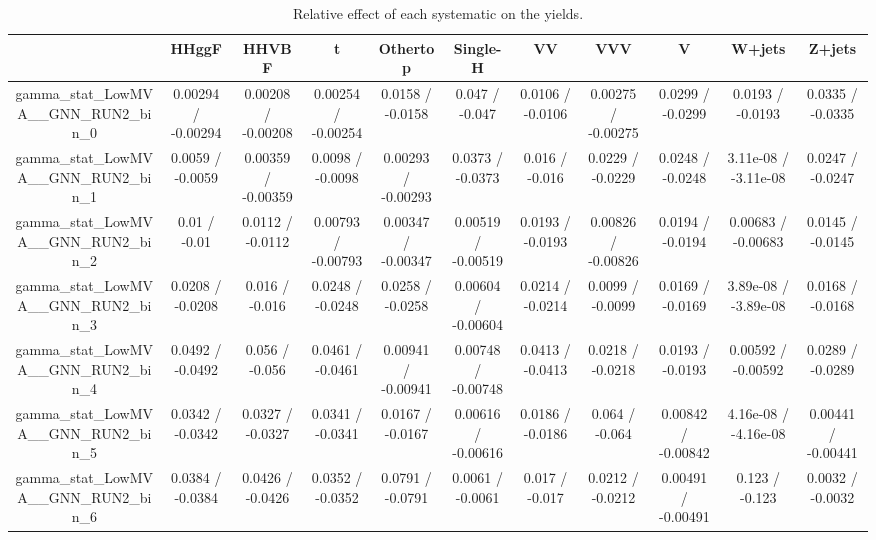 \documentclass[10pt]{article}
\begin{document}
\begin{table}[htbp]
\begin{center}
\begin{tabular}{|c|c|c|c|c|c|c|c|c|c|c|}
\hline 
      & HHggF      & HHVBF      & t      & Othertop      & Single-H      & VV      & VVV      & V      & W+jets      & Z+jets \\ 
\hline 
  gamma_stat_LowMVA__GNN_RUN2_bin_0 & 0.00294 / -0.00294 & 0.00208 / -0.00208 & 0.00254 / -0.00254 & 0.0158 / -0.0158 & 0.047 / -0.047 & 0.0106 / -0.0106 & 0.00275 / -0.00275 & 0.0299 / -0.0299 & 0.0193 / -0.0193 & 0.0335 / -0.0335 \\ 
  gamma_stat_LowMVA__GNN_RUN2_bin_1 & 0.0059 / -0.0059 & 0.00359 / -0.00359 & 0.0098 / -0.0098 & 0.00293 / -0.00293 & 0.0373 / -0.0373 & 0.016 / -0.016 & 0.0229 / -0.0229 & 0.0248 / -0.0248 & 3.11e-08 / -3.11e-08 & 0.0247 / -0.0247 \\ 
  gamma_stat_LowMVA__GNN_RUN2_bin_2 & 0.01 / -0.01 & 0.0112 / -0.0112 & 0.00793 / -0.00793 & 0.00347 / -0.00347 & 0.00519 / -0.00519 & 0.0193 / -0.0193 & 0.00826 / -0.00826 & 0.0194 / -0.0194 & 0.00683 / -0.00683 & 0.0145 / -0.0145 \\ 
  gamma_stat_LowMVA__GNN_RUN2_bin_3 & 0.0208 / -0.0208 & 0.016 / -0.016 & 0.0248 / -0.0248 & 0.0258 / -0.0258 & 0.00604 / -0.00604 & 0.0214 / -0.0214 & 0.0099 / -0.0099 & 0.0169 / -0.0169 & 3.89e-08 / -3.89e-08 & 0.0168 / -0.0168 \\ 
  gamma_stat_LowMVA__GNN_RUN2_bin_4 & 0.0492 / -0.0492 & 0.056 / -0.056 & 0.0461 / -0.0461 & 0.00941 / -0.00941 & 0.00748 / -0.00748 & 0.0413 / -0.0413 & 0.0218 / -0.0218 & 0.0193 / -0.0193 & 0.00592 / -0.00592 & 0.0289 / -0.0289 \\ 
  gamma_stat_LowMVA__GNN_RUN2_bin_5 & 0.0342 / -0.0342 & 0.0327 / -0.0327 & 0.0341 / -0.0341 & 0.0167 / -0.0167 & 0.00616 / -0.00616 & 0.0186 / -0.0186 & 0.064 / -0.064 & 0.00842 / -0.00842 & 4.16e-08 / -4.16e-08 & 0.00441 / -0.00441 \\ 
  gamma_stat_LowMVA__GNN_RUN2_bin_6 & 0.0384 / -0.0384 & 0.0426 / -0.0426 & 0.0352 / -0.0352 & 0.0791 / -0.0791 & 0.0061 / -0.0061 & 0.017 / -0.017 & 0.0212 / -0.0212 & 0.00491 / -0.00491 & 0.123 / -0.123 & 0.0032 / -0.0032 \\ 
\hline 
\end{tabular} 
\caption{Relative effect of each systematic on the yields.} 
\end{center} 
\end{table} 
\end{document}
